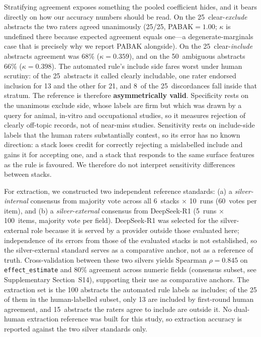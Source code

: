 \documentclass[preprint,review,12pt,authoryear]{elsarticle}
\begin{document}
Stratifying agreement exposes something the pooled coefficient hides, and it bears directly on how our accuracy numbers should be read.
On the 25~clear-\emph{exclude} abstracts the two raters agreed unanimously (25/25, PABAK${=}1.00$; $\kappa$ is undefined there because expected agreement equals one---a degenerate-marginals case that is precisely why we report PABAK alongside).
On the 25~clear-\emph{include} abstracts agreement was 68\% ($\kappa{=}0.359$), and on the 50~ambiguous abstracts 66\% ($\kappa{=}0.398$).
The automated rule's include side fares worst under human scrutiny: of the 25~abstracts it called clearly includable, one rater endorsed inclusion for 13 and the other for 21, and 8~of the 25~discordances fall inside that stratum.
The reference is therefore \textbf{asymmetrically valid}. Specificity rests on the unanimous exclude side, whose labels are firm but which was drawn by a query for animal, in-vitro and occupational studies, so it measures rejection of clearly off-topic records, not of near-miss studies. Sensitivity rests on include-side labels that the human raters substantially contest, so its error has no known direction: a stack loses credit for correctly rejecting a mislabelled include and gains it for accepting one, and a stack that responds to the same surface features as the rule is favoured. We therefore do not interpret sensitivity differences between stacks.

For extraction, we constructed two independent reference standards: (a) a \emph{silver-internal} consensus from majority vote across all 6~stacks $\times$ 10~runs (60~votes per item), and (b) a \emph{silver-external} consensus from DeepSeek-R1 (5~runs $\times$ 100~items, majority vote per field).
DeepSeek-R1 was selected for the silver-external role because it is served by a provider outside those evaluated here; independence of its errors from those of the evaluated stacks is not established, so the silver-external standard serves as a comparative anchor, not as a reference of truth.
Cross-validation between these two silvers yields Spearman $\rho{=}0.845$ on \texttt{effect\_estimate} and 80\% agreement across numeric fields (consensus subset, see Supplementary Section~S14), supporting their use as comparative anchors.
The extraction set is the 100 abstracts the automated rule labels as includes; of the 25 of them in the human-labelled subset, only 13 are included by first-round human agreement, and 15~abstracts the raters agree to include are outside it. No dual-human extraction reference was built for this study, so extraction accuracy is reported against the two silver standards only.
\end{document}
